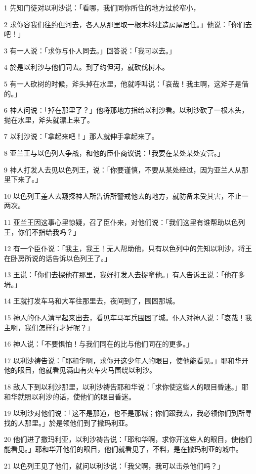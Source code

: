 \par 1 先知门徒对以利沙说：「看哪，我们同你所住的地方过於窄小，
\par 2 求你容我们往约但河去，各人从那里取一根木料建造房屋居住。」他说：「你们去吧！」
\par 3 有一人说：「求你与仆人同去。」回答说：「我可以去。」
\par 4 於是以利沙与他们同去。到了约但河，就砍伐树木。
\par 5 有一人砍树的时候，斧头掉在水里，他就呼叫说：「哀哉！我主啊，这斧子是借的。」
\par 6 神人问说：「掉在那里了？」他将那地方指给以利沙看。以利沙砍了一根木头，抛在水里，斧头就漂上来了。
\par 7 以利沙说：「拿起来吧！」那人就伸手拿起来了。
\par 8 亚兰王与以色列人争战，和他的臣仆商议说：「我要在某处某处安营。」
\par 9 神人打发人去见以色列王，说：「你要谨慎，不要从某处经过，因为亚兰人从那里下来了。」
\par 10 以色列王差人去窥探神人所告诉所警戒他去的地方，就防备未受其害，不止一两次。
\par 11 亚兰王因这事心里惊疑，召了臣仆来，对他们说：「我们这里有谁帮助以色列王，你们不指给我吗？」
\par 12 有一个臣仆说：「我主，我王！无人帮助他，只有以色列中的先知以利沙，将王在卧房所说的话告诉以色列王了。」
\par 13 王说：「你们去探他在那里，我好打发人去捉拿他。」有人告诉王说：「他在多坍。」
\par 14 王就打发车马和大军往那里去，夜间到了，围困那城。
\par 15 神人的仆人清早起来出去，看见车马军兵围困了城。仆人对神人说：「哀哉！我主啊，我们怎样行才好呢？」
\par 16 神人说：「不要惧怕！与我们同在的比与他们同在的更多。」
\par 17 以利沙祷告说：「耶和华啊，求你开这少年人的眼目，使他能看见。」耶和华开他的眼目，他就看见满山有火车火马围绕以利沙。
\par 18 敌人下到以利沙那里，以利沙祷告耶和华说：「求你使这些人的眼目昏迷。」耶和华就照以利沙的话，使他们的眼目昏迷。
\par 19 以利沙对他们说：「这不是那道，也不是那城；你们跟我去，我必领你们到所寻找的人那里。」於是领他们到了撒玛利亚。
\par 20 他们进了撒玛利亚，以利沙祷告说：「耶和华啊，求你开这些人的眼目，使他们能看见。」耶和华开他们的眼目，他们就看见了，不料，是在撒玛利亚的城中。
\par 21 以色列王见了他们，就问以利沙说：「我父啊，我可以击杀他们吗？」
